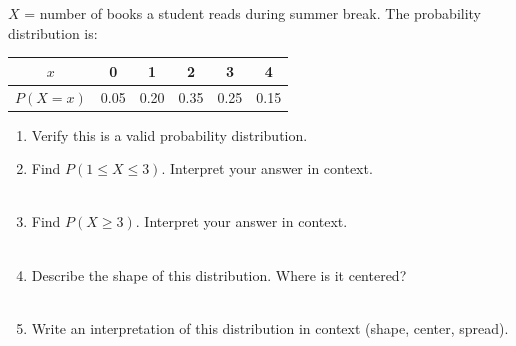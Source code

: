 \documentclass[10pt]{article}
\begin{document}
\vspace{0.12in}

\begin{tcolorbox}[colback=goldbg!60, colframe=goldacc, title=\textbf{Tier A --- Approaching Proficiency},
    arc=2mm, boxrule=0.8pt, left=4mm, right=4mm, top=3mm, bottom=3mm]
\small
$X$ = number of books a student reads during summer break. The probability distribution is:
\begin{center}
\renewcommand{\arraystretch}{1.4}
\begin{tabular}{@{}cccccc@{}}
$x$ & 0 & 1 & 2 & 3 & 4 \\
\hline
$P(X=x)$ & 0.05 & 0.20 & 0.35 & 0.25 & 0.15 \\
\end{tabular}
\end{center}

\begin{enumerate}[leftmargin=1.5em, itemsep=8pt]
  \item Verify this is a valid probability distribution.\\
        \writeline

  \item Find $P(1 \le X \le 3)$. Interpret your answer in context.\\
        \writeline\\[1pt]\writeline

  \item Find $P(X \ge 3)$. Interpret your answer in context.\\
        \writeline\\[1pt]\writeline

  \item Describe the shape of this distribution. Where is it centered?\\
        \writeline\\[1pt]\writeline

  \item Write an interpretation of this distribution in context (shape, center, spread).\\
        \writeline\\[1pt]\writeline
\end{enumerate}
\end{tcolorbox}

\vspace{0.12in}
\end{document}
